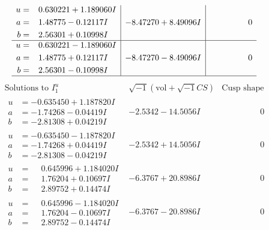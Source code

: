 \documentclass[1p]{elsarticle_modified}
\theoremstyle{definition}
\newcommand{\I}{\sqrt{-1}}
\begin{document}
$$\begin{array}{c|c|c}
\begin{aligned}
u &= \phantom{-}0.630221 + 1.189060 I \\
a &= \phantom{-}1.48775 - 0.12117 I \\
b &= \phantom{-}2.56301 + 0.10998 I\end{aligned}
 & -8.47270 + 8.49096 I & \phantom{-0.000000 } 0 \\ \hline\begin{aligned}
u &= \phantom{-}0.630221 - 1.189060 I \\
a &= \phantom{-}1.48775 + 0.12117 I \\
b &= \phantom{-}2.56301 - 0.10998 I\end{aligned}
 & -8.47270 - 8.49096 I & \phantom{-0.000000 } 0\\
 \hline 
 \end{array}$$\newpage$$\begin{array}{c|c|c}  
\text{Solutions to }I^u_{1}& \I (\text{vol} + \sqrt{-1}CS) & \text{Cusp shape}\\
 \hline 
\begin{aligned}
u &= -0.635450 + 1.187820 I \\
a &= -1.74268 - 0.04419 I \\
b &= -2.81308 + 0.04219 I\end{aligned}
 & -2.5342 - 14.5056 I & \phantom{-0.000000 } 0 \\ \hline\begin{aligned}
u &= -0.635450 - 1.187820 I \\
a &= -1.74268 + 0.04419 I \\
b &= -2.81308 - 0.04219 I\end{aligned}
 & -2.5342 + 14.5056 I & \phantom{-0.000000 } 0 \\ \hline\begin{aligned}
u &= \phantom{-}0.645996 + 1.184020 I \\
a &= \phantom{-}1.76204 + 0.10697 I \\
b &= \phantom{-}2.89752 + 0.14474 I\end{aligned}
 & -6.3767 + 20.8986 I & \phantom{-0.000000 } 0 \\ \hline\begin{aligned}
u &= \phantom{-}0.645996 - 1.184020 I \\
a &= \phantom{-}1.76204 - 0.10697 I \\
b &= \phantom{-}2.89752 - 0.14474 I\end{aligned}
 & -6.3767 - 20.8986 I & \phantom{-0.000000 } 0 \\ \hline\begin{aligned}

\end{aligned}
\end{array}$$
\end{document}
